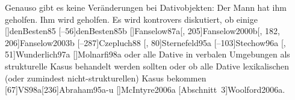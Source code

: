 Genauso gibt es keine Veränderungen bei Dativobjekten:
\eal
\ex Der Mann hat ihm geholfen.
\ex Ihm wird geholfen.
\zl
Es wird kontrovers diskutiert, ob einige 
\parencites
{Wegener85a}%
{Wegener90}%
[]{denBesten85}%
[--56]{denBesten85b}%
[]{Fanselow87a}[, 205]{Fanselow2000b}[, 182, 206]{Fanselow2003b}%
[--287]{Czepluch88}%
[, 80]{Sternefeld95a}%
[--103]{Stechow96a}%
[, 51]{Wunderlich97a}%
[]{Molnarfi98a} %
oder alle \parencites[]{Sternefeld95a}%
[, 205--206]{Ryu97a}%
[--97]{Gunkel2003b} Dative in verbalen Umgebungen als
strukturelle Kasus behandelt werden sollten 
oder ob alle Dative lexikalischen (oder zumindest nicht-strukturellen) Kasus bekommen \parencites[]{Haider85b}%
[]{Haider86}[, 217, 228]{HM94a}%
[270--272]{Mueller99a}[Abschnitt~1.2.1]{Mueller2001a}[]{Mueller2003e}%
[]{Scherpenisse86a}%
[, 291]{Pollard94a}%
[67]{VS98a}[236]{Abraham95a-u}%
[]{McIntyre2006a}%
[Abschnitt~3]{Woolford2006a}.%
